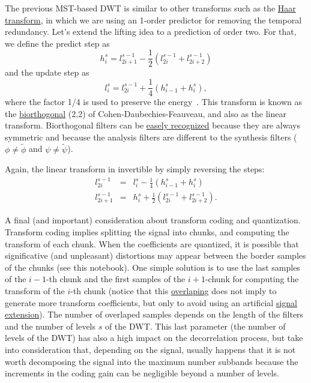 
The previous MST-based DWT is similar to other transforms such as the
\href{https://en.wikipedia.org/wiki/Haar_wavelet}{Haar transform}, in
which we are using an 1-order predictor for removing the temporal
redundancy. Let's extend the lifting idea to a prediction of order
two. For that, we define the predict step as
\begin{equation}
  h^s_i = l^{s-1}_{2i+1} - \frac{1}{2}(l^{s-1}_{2i} + l^{s-1}_{2i+2})
\end{equation}
and the update step as
\begin{equation}
  l^s_i = l^{s-1}_{2i} + \frac{1}{4}(h^s_{i-1} + h^s_i),
\end{equation}
where the factor 1/4 is used to preserve the
energy~\cite{sweldens1997building}. This transform is known as the
\href{https://en.wikipedia.org/wiki/Biorthogonal_wavelet}{biorthogonal}
(2,2) of Cohen-Daubechies-Feauveau, and also as the linear transform.
Biorthogonal filters can be \href{http://wavelets.pybytes.com/}{easely
  recognized} because they are always symmetric and because the
analysis filters are different to the synthesis filters
($\phi\ne\tilde{\phi}$ and $\psi\ne\tilde{\psi}$).

Again, the linear transform in invertible by simply reversing the
steps:
\begin{equation}
  \begin{array}{rcl}
    l^{s-1}_{2i} & = & l^s_i - \frac{1}{4}(h^s_{i-1} + h^s_i)\\
    l^{s-1}_{2i+1} & = & h^s_i + \frac{1}{2}(l^{s-1}_{2i} + l^{s-1}_{2i+2}).
  \end{array}
\end{equation}

A final (and important) consideration about transform coding and
quantization. Transform coding implies splitting the signal into
chunks, and computing the transform of each chunk. When the
coefficients are quantized, it is possible that significative (and
unpleasant) distortions may appear between the border samples of the
chunks (see this notebook). One simple solution is to use the last
samples of the $i-1$-th chunk and the first samples of the $i+1$-chunk
for computing the transform of the $i$-th chunk (notice that this
\href{https://en.wikipedia.org/wiki/Lapped_transform}{overlaping} does
not imply to generate more transform coefficients, but only to avoid
using an artificial
\href{https://pywavelets.readthedocs.io/en/latest/ref/signal-extension-modes.html}{signal
  extension}). The number of overlaped samples depends on the length
of the filters and the number of levels $s$ of the DWT. This last
parameter (the number of levels of the DWT) has also a high impact on
the decorrelation process, but take into consideration that, depending
on the signal, usually happens that it is not worth decomposing the
signal into the maximum number subbands because the increments in the
coding gain can be negligible beyond a number of levels.
  
